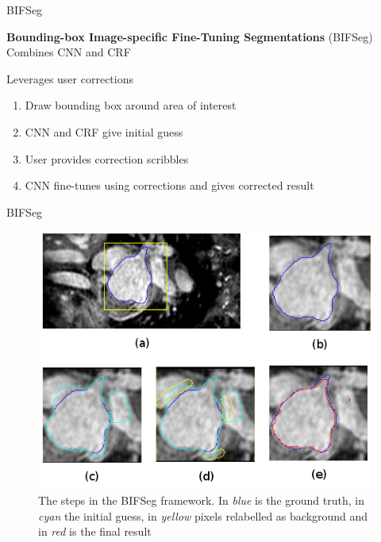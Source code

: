 \documentclass[10pt]{beamer}
\begin{document}
\begin{frame}[fragile]{BIFSeg}

  \textbf{Bounding-box Image-specific Fine-Tuning Segmentations} (BIFSeg)
  Combines CNN and CRF

  Leverages user corrections
  
  \begin{enumerate}
  \item Draw bounding box around area of interest
  \item CNN and CRF give initial guess
  \item User provides correction scribbles
  \item CNN fine-tunes using corrections and gives corrected result
  \end{enumerate}
  
\end{frame}

\begin{frame}[fragile]{BIFSeg}

  \begin{figure}[h!]
    \centering
    \includegraphics[scale=0.46]{pictures/heartBifSeg2}
    \caption{The steps in the BIFSeg framework. In \textit{blue} is the ground truth, in \textit{cyan} the initial guess,
      in \textit{yellow} pixels relabelled as background and in \textit{red} is the final result}
    \label{fig:minCut}
  \end{figure}
  
\end{frame}
\end{document}
